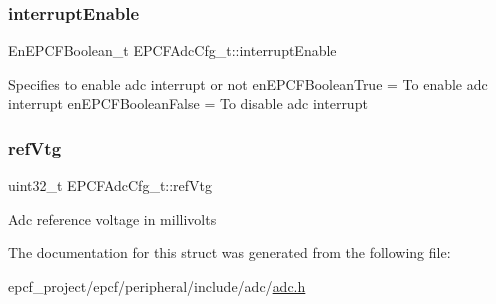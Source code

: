 \subsubsection{\texorpdfstring{interrupt\+Enable}{interruptEnable}}
{\footnotesize\ttfamily En\+E\+P\+C\+F\+Boolean\+\_\+t E\+P\+C\+F\+Adc\+Cfg\+\_\+t\+::interrupt\+Enable}

Specifies to enable adc interrupt or not en\+E\+P\+C\+F\+Boolean\+True = To enable adc interrupt en\+E\+P\+C\+F\+Boolean\+False = To disable adc interrupt \mbox{\label{structEPCFAdcCfg__t_aa1e97380601c94cb2f1a7cc0bc3dbfe2}} 
\subsubsection{\texorpdfstring{ref\+Vtg}{refVtg}}
{\footnotesize\ttfamily uint32\+\_\+t E\+P\+C\+F\+Adc\+Cfg\+\_\+t\+::ref\+Vtg}

Adc reference voltage in millivolts 

The documentation for this struct was generated from the following file\+:\begin{DoxyCompactItemize}
\item 
epcf\+\_\+project/epcf/peripheral/include/adc/\mbox{\hyperlink{adc_8h}{adc.\+h}}\end{DoxyCompactItemize}

